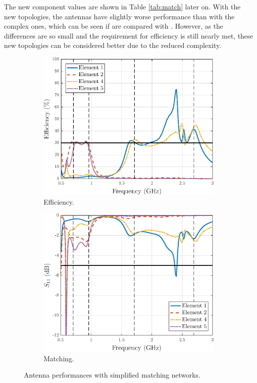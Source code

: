 The new component values are shown in Table \ref{tab:match} later on. With the new topologies, the antennas have slightly worse performance than with the complex ones, which can be seen if  are compared with . However, as the differences are so small and the requirement for efficiency is still nearly met, these new topologies can be considered better due to the reduced complexity.
\begin{figure}[H]
    \centering
    \begin{subfigure}[b]{0.49\textwidth}
        \includegraphics[width=\textwidth]{img/diversity_eff_ideal.eps}
        \caption{Efficiency.}
        \label{fig:div_eff_ideal}
    \end{subfigure}
    \begin{subfigure}[b]{0.49\textwidth}
        \includegraphics[width=\textwidth]{img/diversity_final_match.eps}
        \caption{Matching.}
        \label{fig:div_ideal_match}
    \end{subfigure}
    \caption{Antenna performances with simplified matching networks.}
    \label{fig:div_eff}
    \vspace{-10pt}
\end{figure}

